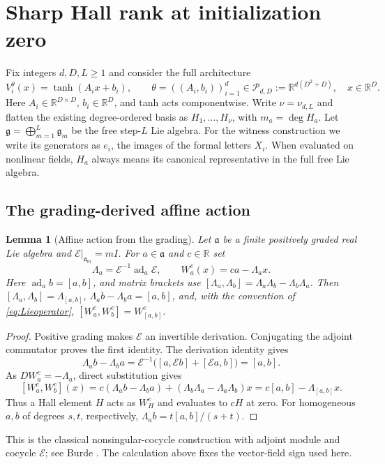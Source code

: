 \documentclass[11pt,a4paper]{article}
\numberwithin{equation}{section}
\newtheorem{lemma}[theorem]{Lemma}
\theoremstyle{definition}
\theoremstyle{remark}
\newcommand{\R}{\mathbb R}
\begin{document}
\section{Sharp Hall rank at initialization zero}
\label{sec:hallrank}
Fix integers $d,D,L\geq1$ and consider the full architecture
\begin{equation}\label{eq:architecture}
 V_i^\theta(x)=\tanh(A_ix+b_i),\qquad
 \theta=((A_i,b_i))_{i=1}^d\in
 \mathcal P_{d,D}:=\R^{d(D^2+D)},\quad x\in\R^D.
\end{equation}
Here $A_i\in\R^{D\times D}$, $b_i\in\R^D$, and tanh acts componentwise.
Write $\nu=\nu_{d,L}$ and flatten the existing degree-ordered basis as
$H_1,\ldots,H_\nu$, with $m_a=\deg H_a$. Let
$\mathfrak g=\bigoplus_{m=1}^L\mathfrak g_m$ be the free step-$L$ Lie
algebra. For the witness construction we write its generators as $e_i$,
the images of the formal letters $X_i$. When evaluated on nonlinear
fields, $H_a$ always means its canonical representative in the full
free Lie algebra.

\subsection{The grading-derived affine action}
\begin{lemma}[Affine action from the grading]\label{lem:gradingaffine}
Let $\mathfrak a$ be a finite positively graded real Lie algebra and
$\mathcal E|_{\mathfrak a_m}=mI$. For $a\in\mathfrak a$ and $c\in\R$ set
\[
 \Lambda_a=\mathcal E^{-1}\operatorname{ad}_a\mathcal E,\qquad
 W_a^c(x)=ca-\Lambda_ax.
\]
Here $\operatorname{ad}_a b=[a,b]$, and matrix brackets use
$[\Lambda_a,\Lambda_b]=\Lambda_a\Lambda_b-\Lambda_b\Lambda_a$.
Then $[\Lambda_a,\Lambda_b]=\Lambda_{[a,b]}$,
$\Lambda_ab-\Lambda_ba=[a,b]$, and, with the convention of
\eqref{eq:Lieoperator}, $[W_a^c,W_b^c]=W_{[a,b]}^c$.
\end{lemma}
\begin{proof}
Positive grading makes $\mathcal E$ an invertible derivation. Conjugating
the adjoint commutator proves the first identity. The derivation identity
gives
\[
 \Lambda_ab-\Lambda_ba
 =\mathcal E^{-1}\bigl([a,\mathcal Eb]+[\mathcal Ea,b]\bigr)=[a,b].
\]
As $DW_a^c=-\Lambda_a$, direct substitution gives
\[
 [W_a^c,W_b^c](x)
 =c(\Lambda_ab-\Lambda_ba)
   +(\Lambda_b\Lambda_a-\Lambda_a\Lambda_b)x
 =c[a,b]-\Lambda_{[a,b]}x.
\]
Thus a Hall element $H$ acts as $W_H^c$ and evaluates to $cH$ at zero.
For homogeneous $a,b$ of degrees $s,t$, respectively,
$\Lambda_ab=t[a,b]/(s+t)$.
\end{proof}
This is the classical nonsingular-cocycle construction with adjoint
module and cocycle $\mathcal E$; see Burde
\cite[Section 3.1, Proposition 3.3, Corollaries 3.4--3.5]{BurdePreLie}.
The calculation above fixes the vector-field sign used here.
\end{document}
